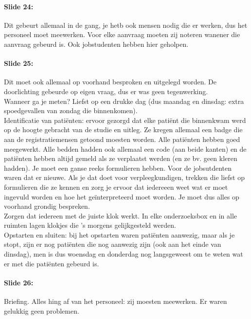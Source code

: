 \documentclass[10pt,a4paper]{report}
\begin{document}
\paragraph{Slide 24:} Dit gebeurt allemaal in de gang, je hetb ook mensen nodig die er werken, dus het personeel moet meewerken. Voor elke aanvraag moeten zij noteren wanener die aanvraag gebeurd is. Ook jobstudenten hebben hier geholpen. 

\paragraph{Slide 25:} Dit moet ook allemaal op voorhand besproken en uitgelegd worden. De doorlichting gebeurde op eigen vraag, dus er was geen tegenwerking.\\
Wanneer ga je meten? Liefst op een drukke dag (dus maandag en dinsdag: extra spoedgevallen van zondag die binnenkomen).\\
Identificatie van pati\"enten: ervoor gezorgd dat elke pati\"ent die binnenkwam werd op de hoogte gebracht van de studie en uitleg. Ze kregen allemaal een badge die aan de registratiemensen getoond moesten worden. Alle pati\"enten hebben goed meegewerkt. Alle bedden hadden ook allemaal een code (aan beide kanten) en de pati\"enten hebben altijd gemeld als ze verplaatst werden (en ze bv. geen kleren hadden).
Je moet een ganse reeks formulieren hebben. Voor de jobsutdenten waren dat er nieuwe. Als je dat doet voor verpleegkundigen, trekken die liefst op formulieren die ze kennen en zorg je ervoor dat iedereeen weet wat er moet ingevuld worden en hoe het ge\"interpreteerd moet worden. Je moet dus alles op voorhand grondig bespreken.\\
Zorgen dat iedereen met de juiste klok werkt. In elke onderzoeksbox en in alle ruimten lagen klokjes die 's morgens gelijkgesteld werden.\\
Opstarten en sluiten: bij het opstarten waren pati\"enten aanwezig, maar als je stopt, zijn er nog pati\"enten die nog aanwezig zijn (ook aan het einde van dinsdag), men is dus woensdag en donderdag nog langsgeweest om te weten wat er met die pati\"enten gebeurd is.

\paragraph{Slide 26:} Briefing. Alles hing af van het personeel: zij moesten meewerken. Er waren gelukkig geen problemen. 
\end{document}
